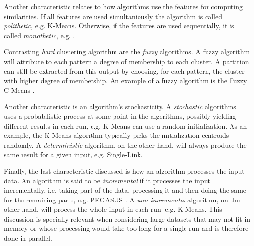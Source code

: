 Another characteristic relates to how algorithms use the features for computing similarities.
If all features are used simultaniously the algorithm is called \emph{polithetic}, e.g. K-Means.
Otherwise, if the features are used sequentially, it is called \emph{monothetic}, e.g. \cite{Chavent1998}.

Contrasting \emph{hard} clustering algorithm are the \emph{fuzzy} algorithms.
A fuzzy algorithm will attribute to each pattern a degree of membership to each cluster.
A partition can still be extracted from this output by choosing, for each pattern, the cluster with higher degree of membership.
An example of a fuzzy algorithm is the Fuzzy C-Means \cite{Bezdek1984}.

Another characteristic is an algorithm's stochasticity.
A \emph{stochastic} algorithms uses a probabilistic process at some point in the algorithms, possibly yielding different results in each run, e.g. K-Means can use a random initialization.
As an example, the K-Means algorithm typically picks the initialization centroids randomly.
A \emph{deterministic} algorithm, on the other hand, will always produce the same result for a given input, e.g. Single-Link.

Finally, the last characteristic discussed is how an algorithm processes the input data.
An algorithm is said to be \emph{incremental} if it processes the input incrementally, i.e. taking part of the data, processing it and then doing the same for the remaining parts, e.g. PEGASUS \cite{Kang2011}.
A \emph{non-incremental} algorithm, on the other hand, will process the whole input in each run, e.g. K-Means.
This discussion is specially relevant when considering large datasets that may not fit in memory or whose processing would take too long for a single run and is therefore done in parallel.





